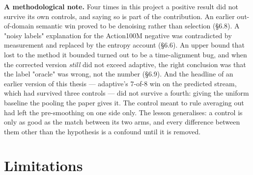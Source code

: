 \textbf{A methodological note.} Four times in this project a positive result did not survive its own controls, and saying so is part of the contribution. An earlier out-of-domain semantic win proved to be denoising rather than selection (\S6.8). A "noisy labels" explanation for the Action100M negative was contradicted by measurement and replaced by the entropy account (\S6.6). An upper bound that lost to the method it bounded turned out to be a time-alignment bug, and when the corrected version \emph{still} did not exceed adaptive, the right conclusion was that the label "oracle" was wrong, not the number (\S6.9). And the headline of an earlier version of this thesis --- adaptive's 7-of-8 win on the predicted stream, which had survived three controls --- did not survive a fourth: giving the uniform baseline the pooling the paper gives it. The control meant to rule averaging out had left the pre-smoothing on one side only. The lesson generalises: a control is only as good as the match between its two arms, and every difference between them other than the hypothesis is a confound until it is removed.

\medskip

\section{Limitations}

